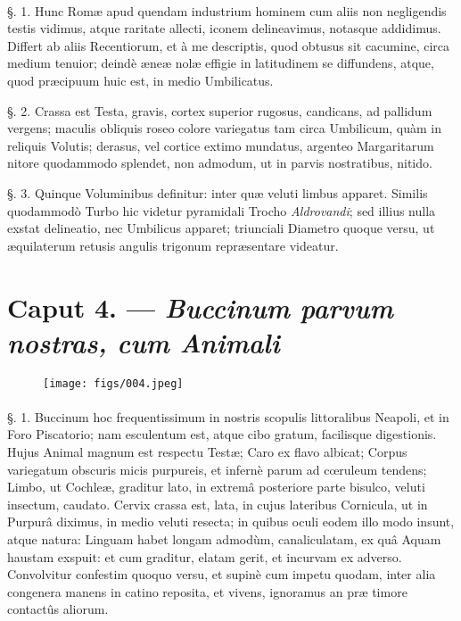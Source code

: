 \documentclass[a4paper, 11pt, oneside, polutonikogreek, german]{article}
\begin{document}
\paragraph{}
§. 1. Hunc Romæ apud quendam industrium hominem cum aliis non negligendis testis vidimus, atque raritate allecti, iconem delineavimus, notasque addidimus. Differt ab aliis Recentiorum, et à me descriptis, quod obtusus sit cacumine, circa medium tenuior; deindè æneæ nolæ effigie in latitudinem se diffundens, atque, quod præcipuum huic est, in medio Umbilicatus.

§. 2. Crassa est Testa, gravis, cortex superior rugosus, candicans, ad pallidum vergens; maculis obliquis roseo colore variegatus tam circa Umbilicum, quàm in reliquis Volutis; derasus, vel cortice extimo mundatus, argenteo Margaritarum nitore quodammodo splendet, non admodum, ut in parvis nostratibus, nitido.

§. 3. Quinque Voluminibus definitur: inter quæ veluti limbus apparet. Similis quodammodò Turbo hic videtur pyramidali Trocho \emph{Aldrovandi}; sed illius nulla exstat delineatio, nec Umbilicus apparet; triunciali Diametro quoque versu, ut æquilaterum retusis angulis trigonum repræsentare videatur.

\section{Caput 4. --- \emph{Buccinum parvum nostras, cum Animali}}
\begin{figure}[H]
\centering
\texttt{[image: figs/004.jpeg]}

\end{figure}
\paragraph{}
§. 1. Buccinum hoc frequentissimum in nostris scopulis littoralibus Neapoli, et in Foro Piscatorio; nam esculentum est, atque cibo gratum, facilisque digestionis. Hujus Animal magnum est respectu Testæ; Caro ex flavo albicat; Corpus variegatum obscuris micis purpureis, et infernè parum ad cœruleum tendens; Limbo, ut Cochleæ, graditur lato, in extremâ posteriore parte bisulco, veluti insectum, caudato. Cervix crassa est, lata, in cujus lateribus Cornicula, ut in Purpurâ diximus, in medio veluti resecta; in quibus oculi eodem illo modo insunt, atque natura: Linguam habet longam admodùm, canaliculatam, ex quâ Aquam haustam exspuit: et cum graditur, elatam gerit, et incurvam ex adverso. Convolvitur confestim quoquo versu, et supinè cum impetu quodam, inter alia congenera manens in catino reposita, et vivens, ignoramus an præ timore contactûs aliorum.
\end{document}
